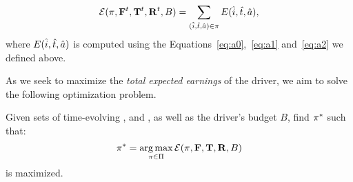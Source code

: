 \begin{equation}\label{eq:totalexpectedearnings}
\mathcal{E} (\pi,{\mathbf{F}}^{t},{\mathbf{T}}^{t},{\mathbf{R}}^{t},B) = \sum_{(\hat{i},\hat{t},\hat{a})\in\pi}E({\hat{i}},{\hat{t}},{\hat{a}}),
\end{equation}
where $E({\hat{i}},{\hat{t}},{\hat{a}})$ is computed
using the Equations~\eqref{eq:a0},~\eqref{eq:a1} and~\eqref{eq:a2} we defined above.

As we seek to maximize the \emph{total expected earnings} of the driver,
we aim to solve the following optimization problem.

\begin{problem}[{\originalproblem}]\label{problem:theproblem}
Given sets of time-evolving {\empiricaltransitionmatrix}, {\traveltimematrix} and {\rewardsmatrix}, as well as the driver's budget $B$,
find $\pi^\ast$
such that:
\[
\pi^\ast = \operatorname*{arg\,max}_{\pi\in \Pi}\mathcal{E}(\pi,{\mathbf{F}},{\mathbf{T}},{\mathbf{R}},B)
\]
is maximized.
\end{problem}

